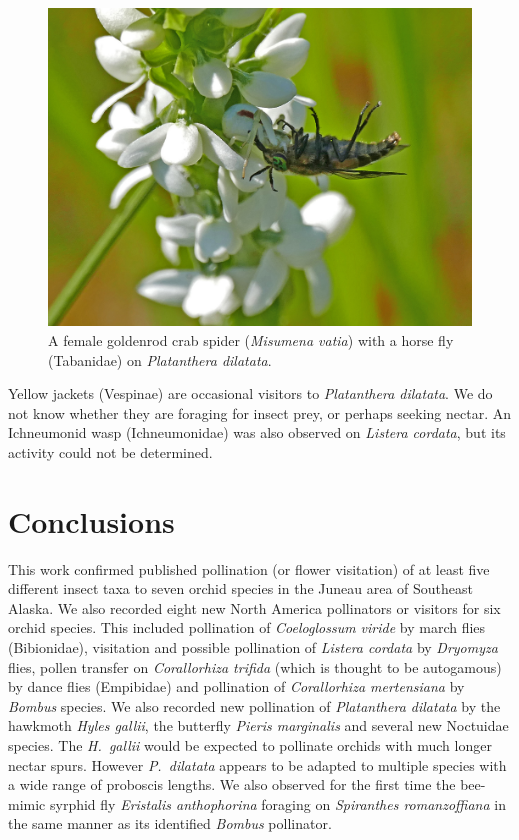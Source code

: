 \begin{multicols}{2}
\begin{figure}[H]
\begin{center}
\vspace{2mm}
\includegraphics[width=\textwidth]{img/Misumena_vatia_Tabanidae.jpg}
\caption{A female goldenrod crab spider (\emph{Misumena vatia}) with a horse fly (Tabanidae) on \emph{Platanthera dilatata}.}
\label{Misumena_vatia_Tabanidae}
\end{center}
\end{figure}


Yellow jackets (Vespinae) are occasional visitors to \emph{Platanthera
dilatata}. We do not know whether they are foraging for insect prey, or
perhaps seeking nectar. An Ichneumonid wasp (Ichneumonidae) was also
observed on \emph{Listera cordata}, but its activity could not be
determined.

\section{Conclusions}

This work confirmed published pollination (or flower visitation) of at
least five different insect taxa to seven orchid species in the Juneau
area of Southeast Alaska. We also recorded eight new North America
pollinators or visitors for six orchid species. This included
pollination of \emph{Coeloglossum viride} by march flies (Bibionidae),
visitation and possible pollination of \emph{Listera cordata} by
\emph{Dryomyza} flies, pollen transfer on \emph{Corallorhiza trifida} (which is thought to be autogamous) by dance flies (Empibidae) and pollination of \emph{Corallorhiza mertensiana} by \emph{Bombus} species. We also recorded new pollination of \emph{Platanthera dilatata} by the hawkmoth \emph{Hyles gallii}, the butterfly \emph{Pieris marginalis} and several
new Noctuidae species. The \emph{H.\ gallii} would be expected to
pollinate orchids with much longer nectar spurs. However \emph{P.\
dilatata} appears to be adapted to multiple species with a wide range of
proboscis lengths. We also observed for the first time the bee-mimic
syrphid fly \emph{Eristalis anthophorina} foraging on \emph{Spiranthes
romanzoffiana} in the same manner as its identified \emph{Bombus}
pollinator.


\end{multicols}
